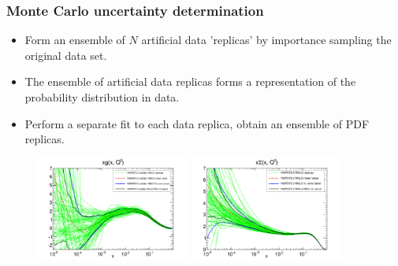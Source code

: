 \documentclass[10pt]{beamer}
\begin{document}
\begin{frame}
\frametitle{Monte Carlo uncertainty determination}
\begin{itemize}
\item<1->Form an ensemble of $N$ artificial data 'replicas' by importance sampling the original data set.
\\
\item<1->The ensemble of artificial data replicas forms a representation of the probability distribution in data.
\\
\item<1->Perform a separate fit to each data replica, obtain an ensemble of PDF replicas.
\\
\end{itemize}
 \begin{figure}[b!]
    \begin{center}
      \includegraphics[width=0.45\textwidth]{xg_rep_Q_2_log-23coll-nnlo.pdf}
      \includegraphics[width=0.45\textwidth]{xSinglet_rep_Q_2_log-23-nnlo.pdf}
    \end{center}
    \vskip-0.5cm
    \label{fig:pdf-jets}
\end{figure}

\end{frame}
\end{document}
